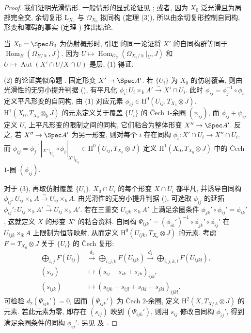 \begin{proof}
我们证明光滑情形. 一般情形的显式论证见 \cite[定理 $4.4$]{Vis97}; 或者, 因为 $X_0$ 泛光滑且为局部完全交, 余切复形 $\mathrm L_{X_0}$ 与 $\Omega_{X_0}$ 拟同构 (定理 (3)), 所以由余切复形控制自同构, 形变和障碍的事实 (定理 ) 推出结论.

当 $X_0=\Spec B_0$ 为仿射概形时, 引理  的同一论证将 $X'$ 的自同构群等同于 $\operatorname{Hom}_B(\Omega_{B/\Bbbk},J)$. 因为 $U\mapsto\operatorname{Hom}_{\mathcal O_U}(\Omega_{X_0/\Bbbk}|_U,J)$ 和 $U\mapsto\operatorname{Aut}(X'\cap U/X\cap U)$ 是层, (1) 得证.

(2) 的论证类似命题 . 固定形变 $X'\to\Spec A'$. 若 $\{U_i\}$ 为 $X_0$ 的仿射覆盖, 则由光滑性的无穷小提升判据 (), 有平凡化 $\phi_i:U_i\times_{\Bbbk}A'\xrightarrow{\sim}X'\cap U_i$. 此时 $\phi_{ij}=\phi_j^{-1}\circ\phi_i$ 定义平凡形变的自同构, 由 (1) 对应元素 $\phi_{ij}\in\mathrm H^0(U_{ij},T_{X_0}\otimes J)$. $\mathrm H^1(X_0,T_{X_0}\otimes_{\Bbbk}J)$ 的元素定义关于覆盖 $\{U_i\}$ 的 Čech $1$-余圈 $(\psi_{ij})$, 而 $\phi_{ij}+\psi_{ij}$ 定义 $U_i$ 上平凡形变的限制之间的同构, 它们粘合为整体形变 $X''\to\Spec A'$. 反之, 若 $X''\to\Spec A'$ 为另一形变, 则对每个 $i$ 存在同构 $\phi_i:X'\cap U_i\to X''\cap U_i$, 而 $\phi_{ij}=\phi_j^{-1}|_{X''|_{U_{ij}}}\circ\phi_i|_{X'|_{U_{ij}}}\in\mathrm H^0(U_{ij},T_{X_0}\otimes J)$ 定义 $\mathrm H^1(X_0,T_{X_0}\otimes J)$ 中的 Čech $1$-圈 $(\phi_{ij})$.

对于 (3), 再取仿射覆盖 $\{U_i\}$. $X_0\cap U_i$ 的每个形变 $X\cap U_i$ 都平凡, 并诱导自同构 $\phi_{ij}:U_{ij}\times_{\Bbbk}A\xrightarrow{\sim}U_{ij}\times_{\Bbbk}A$. 由光滑性的无穷小提升判据 (), 可选取 $\phi_{ij}$ 的延拓 $\phi_{ij}':U_{ij}\times_{\Bbbk}A'\xrightarrow{\sim}U_{ij}\times_{\Bbbk}A'$. 若在三重交 $U_{ijk}\times_{\Bbbk}A'$ 上满足余圈条件 $\phi_{jk}'\circ\phi_{ij}'=\phi_{ik}'$, 这就定义 $X$ 的形变 $X'$ 的粘合资料. 自同构 $\Psi_{ijk}'=(\phi_{ik}')^{-1}\circ\phi_{jk}'\circ\phi_{ij}'$ 在 $U_{ijk}\times_{\Bbbk}A$ 上限制为恒等映射, 从而定义 $\mathrm H^0(U_{ijk},T_{X_0}\otimes J)$ 的元素. 考虑 $F=T_{X_0}\otimes J$ 关于 $\{U_i\}$ 的 Čech 复形:
\[
\begin{aligned}
\bigoplus_{i,j}F(U_{ij})&\xrightarrow{d_1}\bigoplus_{i,j,k}F(U_{ijk})\xrightarrow{d_2}\bigoplus_{i,j,k,l}F(U_{ijkl}),\\
(s_{ij})&\longmapsto(s_{ij}-s_{ik}+s_{jk})_{ijk},\\
(s_{ijk})&\longmapsto(s_{ijk}-s_{ijl}+s_{ikl}-s_{jkl})_{ijkl}.
\end{aligned}
\]
可检验 $d_2(\Psi_{ijk}')=0$, 因而 $(\Psi_{ijk}')$ 为 Čech $2$-余圈, 定义 $\mathrm H^2(X,T_{X/A}\otimes J)$ 的元素. 若此元素为零, 即存在 $(s_{ij})$ 映到 $(\Psi_{ijk}')$, 则用 $s_{ij}$ 修改自同构 $\phi_{ij}'$, 得到满足余圈条件的同构 $\phi_{ij}'$. 另见 \cite[命题 $1.2.12$]{Ser06} 及 \cite[推论 $10.3$]{Har10}.
\end{proof}

